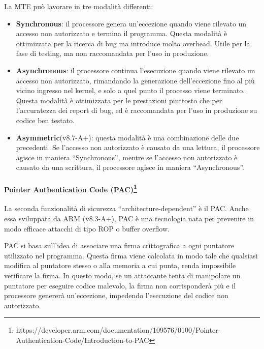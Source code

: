 \bigskip
La MTE può lavorare in tre modalità differenti:
\begin{itemize}
  \item \textbf{Synchronous}: il processore genera un'eccezione quando viene rilevato
    un accesso non autorizzato e termina il programma. Questa modalità è
    ottimizzata per la ricerca di bug ma introduce molto overhead. Utile per la fase
    di testing, ma non raccomandata per l'uso in produzione.

  \item \textbf{Asynchronous}: il processore continua l'esecuzione quando viene rilevato
    un accesso non autorizzato, rimandando la generazione dell'eccezione fino al
    più vicino ingresso nel kernel, e solo a quel punto il processo viene terminato.
    Questa modalità è ottimizzata per le prestazioni piuttosto che per l'accuratezza
    dei report di bug, ed è raccomandata per l'uso in produzione su codice ben testato.

  \item \textbf{Asymmetric}(v8.7-A+): questa modalità è una combinazione delle
    due precedenti. Se l'accesso non autorizzato è causato da una lettura, il
    processore agisce in maniera ``Synchronous'', mentre se l'accesso non autorizzato
    è causato da una scrittura, il processore agisce in maniera ``Asynchronous''.
\end{itemize}

\paragraph{Pointer Authentication Code (PAC)\protect\footnote{https://developer.arm.com/documentation/109576/0100/Pointer-Authentication-Code/Introduction-to-PAC}}
La seconda funzionalità di sicurezza ``architecture-dependent'' è il PAC. Anche essa
sviluppata da ARM (v8.3-A+), PAC è una tecnologia nata per prevenire in modo
efficace attacchi di tipo ROP o buffer overflow.

PAC si basa sull'idea di associare una firma crittografica a ogni puntatore
utilizzato nel programma. Questa firma viene calcolata in modo tale che qualsiasi
modifica al puntatore stesso o alla memoria a cui punta, renda impossibile
verificare la firma. In questo modo, se un attaccante tenta di manipolare un
puntatore per eseguire codice malevolo, la firma non corrisponderà più e il processore
genererà un'eccezione, impedendo l'esecuzione del codice non autorizzato.

